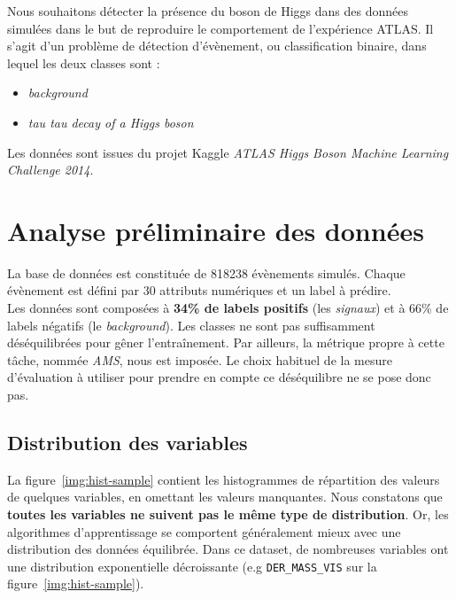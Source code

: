 \documentclass[12pt]{article}
\newcommand{\figref}[1]{figure~\ref{#1}}
\begin{document}
Nous souhaitons détecter la présence du boson de Higgs dans des données simulées
dans le but de reproduire le comportement de l'expérience ATLAS. Il s'agit d'un
problème de détection d'évènement, ou classification binaire, dans lequel les
deux classes sont :

\begin{itemize}
    \item \emph{background}
    \item \emph{tau tau decay of a Higgs boson}
\end{itemize}

Les données sont issues du projet Kaggle \emph{ATLAS Higgs Boson Machine Learning Challenge
2014}. 

\section{Analyse préliminaire des données}

La base de données est constituée de 818238 évènements simulés. Chaque évènement
est défini par 30 attributs numériques et un label à prédire. \\

Les données sont composées à \textbf{34\% de labels positifs} (les
\emph{signaux}) et à 66\% de labels négatifs (le \emph{background}). Les classes
ne sont pas suffisamment déséquilibrées pour gêner l'entraînement. Par ailleurs,
la métrique propre à cette tâche, nommée \emph{AMS}, nous est imposée. Le choix
habituel de la mesure d'évaluation à utiliser pour prendre en compte ce
déséquilibre ne se pose donc pas. \\

\subsection{Distribution des variables}

La \figref{img:hist-sample} contient les histogrammes de répartition des valeurs
de quelques variables, en omettant les valeurs manquantes. Nous constatons que
\textbf{toutes les variables ne suivent pas le même type de distribution}. Or, les
algorithmes d'apprentissage se comportent généralement mieux avec une
distribution des données équilibrée. Dans ce dataset, de nombreuses variables
ont une distribution exponentielle décroissante (e.g \texttt{DER\_MASS\_VIS} sur
la \figref{img:hist-sample}).
\end{document}
